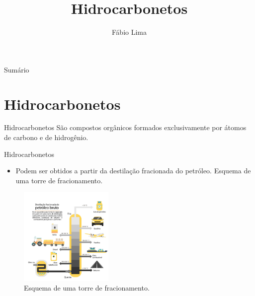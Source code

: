 \documentclass[presentation,professionalfonts,smaller,aspectratio=169]{beamer}
\date{}
\author{Fábio Lima}
\date{}
\title{Hidrocarbonetos}
\begin{document}
\maketitle
\begin{frame}{Sumário}
\tableofcontents
\end{frame}




\section{Hidrocarbonetos}
\label{sec:org49dd7c3}
\begin{frame}[label={sec:org88c360f}]{Hidrocarbonetos}
São compostos orgânicos formados exclusivamente por átomos de carbono e de hidrogênio.
%
\end{frame}



\begin{frame}[label={sec:org8a2585a}]{Hidrocarbonetos}
\begin{itemize}
\item Podem ser obtidos a partir da destilação fracionada do petróleo. Esquema de uma torre de fracionamento.
\end{itemize}

\begin{figure}[htbp]
\centering
\includegraphics[width=0.4\textwidth]{QO/Hidrocarbonetos/torre.jpg}
\caption{\label{fig:org17f539a}Esquema de uma torre de fracionamento.}
\end{figure}
\end{frame}
\end{document}

